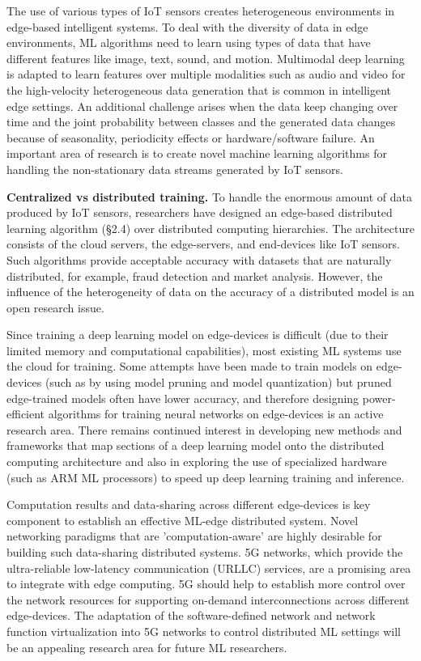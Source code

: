 \documentclass[letterpaper, 10 pt, conference]{ieeeconf}
\begin{document}
The use of various types of IoT sensors creates heterogeneous environments in edge-based intelligent systems. To deal with the diversity of data in edge environments, ML algorithms need to learn using types of data that have different features like image, text, sound, and motion. Multimodal deep learning is adapted to learn features over multiple modalities such as audio and video\cite{Ngiam_Khosla_Kim_Nam_Lee_Ng_2011} for the high-velocity heterogeneous data generation that is common in intelligent edge settings. An additional challenge arises when the data keep changing over time and the joint probability between classes and the generated data changes because of seasonality, periodicity effects or hardware/software failure. An important area of research is to create novel machine learning algorithms for handling the non-stationary data streams generated by IoT sensors\cite{Ditzler_Roveri_Alippi_Polikar_2015}.

\textbf{Centralized vs distributed training.} To handle the enormous amount of data produced by IoT sensors, researchers have designed an edge-based distributed learning algorithm (§2.4) over distributed computing hierarchies. The architecture consists of the cloud servers, the edge-servers, and end-devices like IoT sensors. Such algorithms provide acceptable accuracy with datasets that are naturally distributed, for example, fraud detection and market analysis. However, the influence of the heterogeneity of data on the accuracy of a distributed model is an open research issue\cite{Peteiro-Barral_Guijarro-Berdiñas_2013}.

Since training a deep learning model on edge-devices is difficult (due to their limited memory and computational capabilities), most existing ML systems use the cloud for training. Some attempts have been made to train models on edge-devices (such as by using model pruning and model quantization) but pruned edge-trained models often have lower accuracy, and therefore designing power-efficient algorithms for training neural networks on edge-devices is an active research area. There remains continued interest in developing new methods and frameworks that map sections of a deep learning model onto the distributed computing architecture and also in exploring the use of specialized hardware (such as ARM ML processors) to speed up deep learning training and inference.

Computation results and data-sharing across different edge-devices is key component to establish an effective ML-edge distributed system. Novel networking paradigms that are 'computation-aware' are highly desirable for building such data-sharing distributed systems. 5G networks, which provide the ultra-reliable low-latency communication (URLLC) services, are a promising area to integrate with edge computing. 5G should help to establish more control over the network resources for supporting on-demand interconnections across different edge-devices. The adaptation of the software-defined network and network function virtualization into 5G networks to control distributed ML settings will be an appealing research area for future ML researchers.
\end{document}
